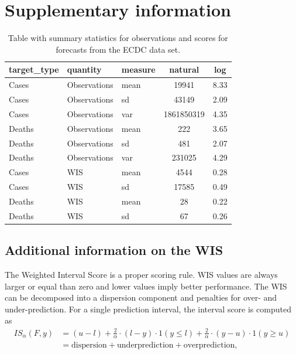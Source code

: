 \documentclass{article}
\begin{document}


\newpage

\appendix
\section{Supplementary information}

\begin{table}[h!]
    \centering
    
   \begin{tabular}{lllcc}
        \toprule
        target\_type & quantity & measure & natural & log\\
        \midrule
        Cases & Observations & mean & 19941 & 8.33\\
        Cases & Observations & sd & 43149 & 2.09\\
        Cases & Observations & var & 1861850319 & 4.35\\
        Deaths & Observations & mean & 222 & 3.65\\
        Deaths & Observations & sd & 481 & 2.07\\
        Deaths & Observations & var & 231025 & 4.29\\
        \addlinespace
        \hline
        \addlinespace
        Cases & WIS & mean & 4544 & 0.28\\
        Cases & WIS & sd & 17585 & 0.49\\
        Deaths & WIS & mean & 28 & 0.22\\
        Deaths & WIS & sd & 67 & 0.26\\
        \bottomrule
        \end{tabular}
    \caption{Table with summary statistics for observations and scores for forecasts from the ECDC data set.}
    \label{tab:HUB-summary}
\end{table}



\subsection{Additional information on the WIS} \label{wis}

The Weighted Interval Score is a proper scoring rule. WIS values are always larger or equal than zero and lower values imply better performance. The WIS can be decomposed into a dispersion component and penalties for over- and under-prediction. For a single prediction interval, the interval score is computed as 
\begin{align}
 IS_\alpha(F,y) &= (u-l) + \frac{2}{\alpha} \cdot (l-y) \cdot 1(y \leq l) + \frac{2}{\alpha} \cdot (y-u) \cdot 1(y \geq u) \\
 &= \text{dispersion} + \text{underprediction} + \text{overprediction},    
\end{align}
\end{document}
